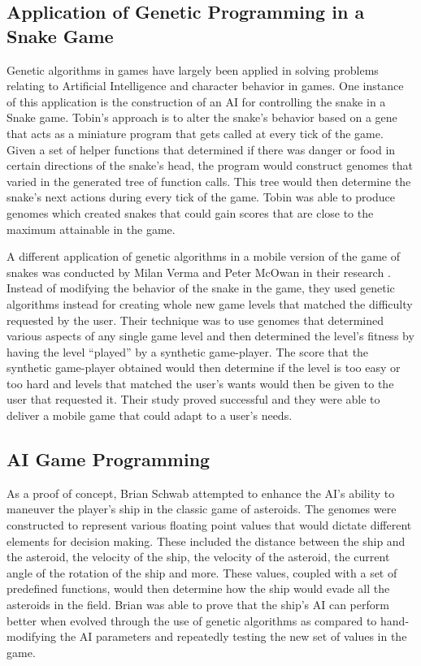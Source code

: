 \subsection{Application of Genetic Programming in a Snake Game}
Genetic algorithms in games have largely been applied in solving problems relating to
Artificial Intelligence and character behavior in games. One instance of this application
is the construction of an AI for controlling the snake in a Snake game\cite{Ehlis00}.
Tobin's approach is to alter the snake's behavior based on a gene that acts as a miniature
program that gets called at every tick of the game. Given a set of helper functions that
determined if there was danger or food in certain directions of the snake's head, the
program would construct genomes that varied in the generated tree of function calls. This
tree would then determine the snake's next actions during every tick of the game. Tobin
was able to produce genomes which created snakes that could gain scores that are close to
the maximum attainable in the game.  


A different application of genetic algorithms in a mobile version of the game of snakes
was conducted by Milan Verma and Peter McOwan in their research \cite{Verma05}. Instead
of modifying the behavior of the snake in the game, they used genetic algorithms instead
for creating whole new game levels that matched the difficulty requested by the user.
Their technique was to use genomes that determined various aspects of any single game
level and then determined the level's fitness by having the level “played” by a synthetic
game-player. The score that the synthetic game-player obtained would then determine if
the level is too easy or too hard and levels that matched the user's wants would then be
given to the user that requested it. Their study proved successful and they were able to
deliver a mobile game that could adapt to a user's needs.

\subsection{AI Game Programming}
As a proof of concept, Brian Schwab attempted to enhance the AI's ability to maneuver
the player's ship in the classic game of asteroids\cite{Schwab04}. The genomes were
constructed to represent various floating point values that would dictate different
elements for decision making. These included the distance between the ship and the asteroid,
the velocity of the ship, the velocity of the asteroid, the current angle of the rotation
of the ship and more. These values, coupled with a set of predefined functions, would then
determine how the ship would evade all the asteroids in the field. Brian was able to prove
that the ship's AI can perform better when evolved through the use of genetic algorithms as
compared to hand-modifying the AI parameters and repeatedly testing the new set of values in
the game.
